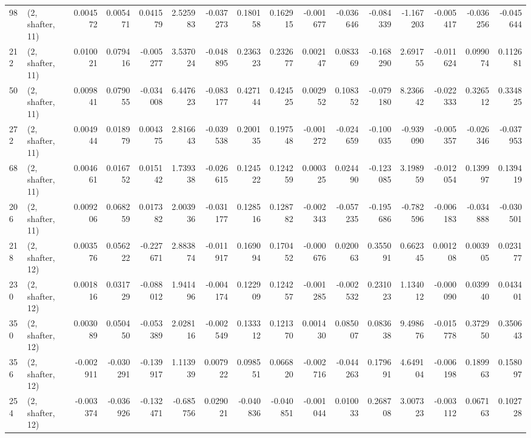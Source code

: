\begin{tabular}{llrrrrrrrrrrrrrr}
98  &  (2, shafter, 11) &   0.004572 &  0.005471 &  0.041579 &    2.525983 & -0.037273 &   0.180158 &  0.162915 & -0.001677 & -0.036646 & -0.084339 &   -1.167203 & -0.005417 & -0.036256 & -0.045644 \\
212 &  (2, shafter, 11) &   0.010021 &  0.079416 & -0.005277 &    3.537024 & -0.048895 &   0.236323 &  0.232677 &  0.002147 &  0.083369 & -0.168290 &    2.691755 & -0.011624 &  0.099074 &  0.112681 \\
50  &  (2, shafter, 11) &   0.009841 &  0.079055 & -0.034008 &    6.447623 & -0.083177 &   0.427144 &  0.424525 &  0.002952 &  0.108352 & -0.079180 &    8.236642 & -0.022333 &  0.326512 &  0.334825 \\
272 &  (2, shafter, 11) &   0.004944 &  0.018979 &  0.004375 &    2.816643 & -0.039538 &   0.200135 &  0.197548 & -0.001272 & -0.024659 & -0.100035 &   -0.939090 & -0.005357 & -0.026346 & -0.037953 \\
68  &  (2, shafter, 11) &   0.004661 &  0.016752 &  0.015142 &    1.739338 & -0.026615 &   0.124522 &  0.124259 &  0.000325 &  0.024490 & -0.123085 &    3.198959 & -0.012054 &  0.139997 &  0.139419 \\
206 &  (2, shafter, 11) &   0.009206 &  0.068259 &  0.017382 &    2.003936 & -0.031177 &   0.128516 &  0.128782 & -0.002343 & -0.057235 & -0.195686 &   -0.782596 & -0.006183 & -0.034888 & -0.030501 \\
218 &  (2, shafter, 12) &   0.003576 &  0.056222 & -0.227671 &    2.883874 & -0.011917 &   0.169094 &  0.170452 & -0.000676 &  0.020063 &  0.355091 &    0.662345 &  0.001208 &  0.003905 &  0.023177 \\
230 &  (2, shafter, 12) &   0.001816 &  0.031729 & -0.088012 &    1.941496 & -0.004174 &   0.122909 &  0.124257 & -0.001285 & -0.002532 &  0.231023 &    1.134012 & -0.000090 &  0.039940 &  0.043401 \\
350 &  (2, shafter, 12) &   0.003089 &  0.050450 & -0.053389 &    2.028116 & -0.002549 &   0.133312 &  0.121370 &  0.001430 &  0.085007 &  0.083638 &    9.498676 & -0.015778 &  0.372950 &  0.350643 \\
356 &  (2, shafter, 12) &  -0.002911 & -0.030291 & -0.139917 &    1.113939 &  0.007922 &   0.098551 &  0.066820 & -0.002716 & -0.044263 &  0.179691 &    4.649104 & -0.006198 &  0.189963 &  0.158097 \\
254 &  (2, shafter, 12) &  -0.003374 & -0.036926 & -0.132471 &   -0.685756 &  0.029021 &  -0.040836 & -0.040851 & -0.001044 &  0.010033 &  0.268708 &    3.007323 & -0.003112 &  0.067163 &  0.102728 \\

\end{tabular}
